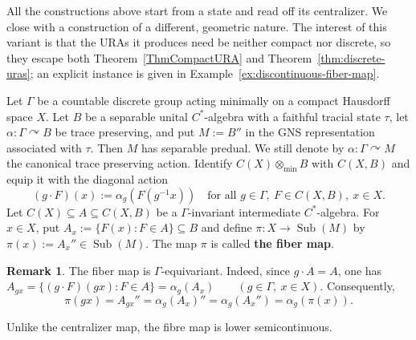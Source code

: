 \documentclass[12pt]{amsart} %
\theoremstyle{plain}
\theoremstyle{definition}
\newtheorem{remark}[theorem]{Remark}
\DeclareMathOperator{\Sub}{Sub}
\begin{document}
All the constructions above start from a state and read off its centralizer. We
close with a construction of a different, geometric nature.  The interest of this variant is that the
URAs it produces need be neither compact nor discrete, so they escape both
Theorem~\ref{ThmCompactURA} and Theorem~\ref{thm:discrete-uras}; an explicit
instance is given in Example~\ref{ex:discontinuous-fiber-map}.


Let $\Gamma$ be a countable discrete group acting minimally on a
compact Hausdorff space $X$. Let $B$ be a separable unital $C^*$-algebra
with a faithful tracial state $\tau$, let
$\alpha:\Gamma\curvearrowright B$ be trace preserving, and put
$M:=B''$ in the GNS representation associated with $\tau$. Then $M$ has separable predual. We still denote by $\alpha:\Gamma\curvearrowright M$ the canonical trace preserving action. Identify
$C(X)\otimes_{\min}B$ with $C(X,B)$ and equip it with the diagonal action
$$
(g\cdot F)(x):=\alpha_g(F(g^{-1}x))
\quad\text{for all }g\in\Gamma,\ F\in C(X,B),\ x\in X.
$$
Let $C(X)\subseteq A\subseteq C(X,B)$ be a $\Gamma$-invariant
intermediate $C^*$-algebra. For $x\in X$, put
$A_x:=\{F(x):F\in A\}\subseteq B$ and define $\pi:X\to\Sub(M)$ by $\pi(x):=A_x''\in\Sub(M)$. The map $\pi$ is called
\textbf{the fiber map}.
\begin{remark}\label{rmk:fiber-map-equivariance}
The fiber map is $\Gamma$-equivariant. Indeed, since $g\cdot A=A$, one has
$A_{gx}
=\{(g\cdot F)(gx):F\in A\}
=\alpha_g(A_x)
\qquad(g\in\Gamma,\ x\in X)$. Consequently,
$$
\pi(gx)=A_{gx}''=\alpha_g(A_x)''=\alpha_g(A_x'')=\alpha_g(\pi(x)).
$$
\end{remark}

\noindent Unlike the centralizer map, the fibre map is lower semicontinuous.
\end{document}
